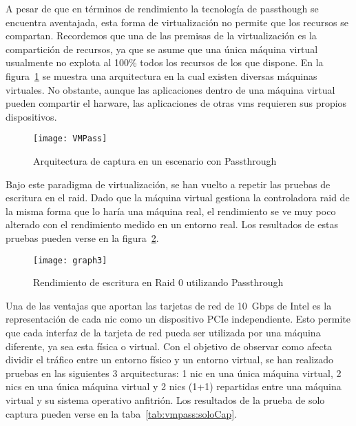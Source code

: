 A pesar de que en términos de rendimiento la tecnología de \gls{passthough} se encuentra aventajada, esta forma de virtualización no permite que los recursos se compartan. Recordemos que una de las premisas de la virtualización es la compartición de recursos, ya que se asume que una única máquina virtual usualmente no explota al 100\% todos los recursos de los que dispone. En la figura~\ref{fig:vmpass} se muestra una arquitectura en la cual existen diversas máquinas virtuales. No obstante, aunque las aplicaciones dentro de una máquina virtual pueden compartir el harware, las aplicaciones de otras \glspl{vm} requieren sus propios dispositivos.

\begin{figure}[!htb]
\centering
\texttt{[image: VMPass]}
\caption{Arquitectura de captura en un escenario con Passthrough} 
\label{fig:vmpass}
\end{figure}

Bajo este paradigma de virtualización, se han vuelto a repetir las pruebas de escritura en el raid. Dado que la máquina virtual gestiona la controladora raid de la misma forma que lo haría una máquina real, el rendimiento se ve muy poco alterado con el rendimiento medido en un entorno real. Los resultados de estas pruebas pueden verse en la figura~\ref{fig:vmfisica:graphdd3}.

\begin{figure}[!htb]
\centering
\texttt{[image: graph3]}
\caption{Rendimiento de escritura en Raid 0 utilizando Passthrough}
\label{fig:vmfisica:graphdd3}
\end{figure}

Una de las ventajas que aportan las tarjetas de red de 10~Gbps de Intel es la representación de cada \gls{nic} como un dispositivo PCIe independiente. Esto permite que cada interfaz de la tarjeta de red pueda ser utilizada por una máquina diferente, ya sea esta física o virtual. Con el objetivo de observar como afecta dividir el tráfico entre un entorno físico y un entorno virtual, se han realizado pruebas en las siguientes 3 arquitecturas: 1 \gls{nic} en una única máquina virtual, 2 \glspl{nic} en una única máquina virtual y 2 \glspl{nic} (1+1) repartidas entre una máquina virtual y su sistema operativo anfitrión. Los resultados de la prueba de solo captura pueden verse en la taba~\ref{tab:vmpass:soloCap}.

